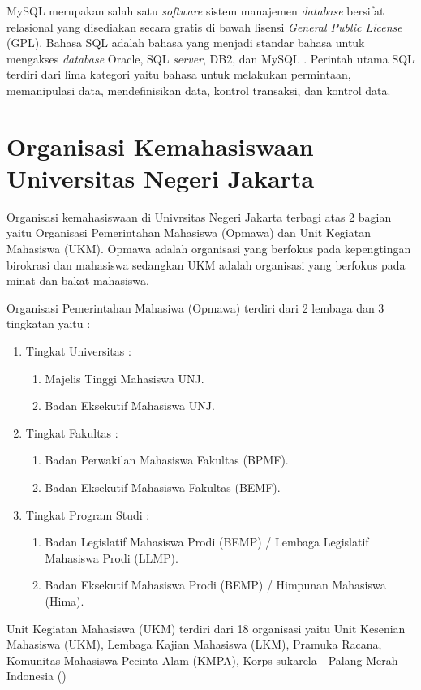 MySQL merupakan salah satu \emph{software} sistem manajemen \emph{database} bersifat relasional yang disediakan secara gratis di bawah lisensi \emph{General Public License} (GPL). Bahasa SQL adalah bahasa yang menjadi standar bahasa untuk mengakses \emph{database} Oracle, SQL \emph{server}, DB2, dan MySQL \cite{andreea}. Perintah utama SQL terdiri dari lima kategori yaitu bahasa untuk melakukan permintaan, memanipulasi data, mendefinisikan data, kontrol transaksi, dan kontrol data. 

\section{Organisasi Kemahasiswaan Universitas Negeri Jakarta}

Organisasi kemahasiswaan di Univrsitas Negeri Jakarta terbagi atas 2 bagian yaitu Organisasi Pemerintahan Mahasiswa (Opmawa) dan Unit Kegiatan Mahasiswa (UKM). Opmawa adalah organisasi yang berfokus pada kepengtingan birokrasi dan mahasiswa sedangkan UKM adalah organisasi yang berfokus pada minat dan bakat mahasiswa.

Organisasi Pemerintahan Mahasiwa (Opmawa) terdiri dari 2 lembaga dan 3 tingkatan yaitu : 
\begin{enumerate}
	\item Tingkat Universitas :
	\begin{enumerate}
		\item Majelis Tinggi Mahasiswa UNJ.
		\item Badan Eksekutif Mahasiswa UNJ.
	\end{enumerate}
	\item Tingkat Fakultas :
	\begin{enumerate}
		\item Badan Perwakilan Mahasiswa Fakultas (BPMF).
		\item Badan Eksekutif Mahasiswa Fakultas (BEMF).
	\end{enumerate} 
	\item Tingkat Program Studi :
	\begin{enumerate}
		\item Badan Legislatif Mahasiswa Prodi (BEMP) / Lembaga Legislatif Mahasiswa Prodi (LLMP).
		\item Badan Eksekutif Mahasiswa Prodi (BEMP) / Himpunan Mahasiswa (Hima).
	\end{enumerate}
\end{enumerate}

Unit Kegiatan Mahasiswa (UKM) terdiri dari 18 organisasi yaitu Unit Kesenian Mahasiswa (UKM), Lembaga Kajian Mahasiswa (LKM), Pramuka Racana, Komunitas Mahasiswa Pecinta Alam (KMPA), Korps sukarela - Palang Merah Indonesia () 

